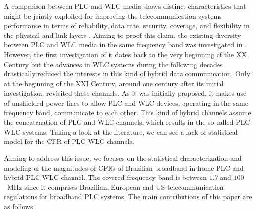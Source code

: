 \documentclass[journal]{IEEEtran}
\begin{document}
A comparison between \ac{PLC} and \ac{WLC} media shows distinct characteristics that might be jointly exploited for improving the telecommunication systems performance in terms of reliability, data rate, security, coverage, and flexibility in the physical and link layers \cite{Dib,Victor2017,Victor2018}. Aiming to proof this claim, the existing diversity between \ac{PLC} and \ac{WLC} media in the same frequency band was investigated in \cite{thiago:hyb, thiago:hyb2, Victor2016, Leo2016}. However, the first investigation of it dates back to the very beginning of the XX Century \cite{Mischa} but the advances in \ac{WLC} systems during the following decades drastically reduced the interests in this kind of hybrid data communication. Only at the beginning of the XXI Century, around one century after its initial investigation, \cite{thiago:hyb} revisited these channels. As it was initially proposed, it makes use of unshielded power lines to allow \ac{PLC} and \ac{WLC} devices, operating in the same frequency band, communicate to each other. %
This kind of hybrid channels assume 
the concatenation of \ac{PLC} and \ac{WLC} channels, which results in the so-called \ac{PLC}-\ac{WLC} systems. Taking a look at the literature, we can see a lack of statistical model for  the \ac{CFR} of \ac{PLC}-\ac{WLC} channels.%

Aiming to address this issue, we focuses on the statistical characterization and modeling of the magnitudes of \acp{CFR} of Brazilian broadband in-home \ac{PLC} and hybrid \ac{PLC}-\ac{WLC} channel. %
The covered frequency band is between $1.7$ and $100$~MHz since it comprises Brazilian, European and US telecommunication regulations for broadband \ac{PLC} systems. The main contributions of this paper are as follows:
\end{document}
